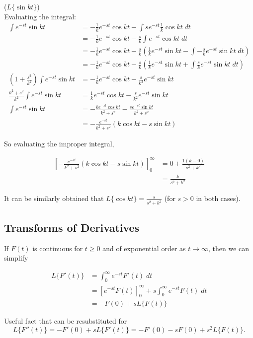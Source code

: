 \begin{definition}($L\{\sin kt\}$)\\
    Evaluating the integral:
    \begin{align*}
        \int e^{-st}\sin kt&=-\frac{1}{k}e^{-st}\cos kt-\int se^{-st}\frac{1}{k}\cos kt \;dt\\
        &=-\frac{1}{k}e^{-st}\cos kt-\frac{s}{k}\int e^{-st}\cos kt \;dt\\
        &=-\frac{1}{k}e^{-st}\cos kt-\frac{s}{k}\left( \frac{1}{k}e^{-st}\sin kt-\int -\frac{s}{k}e^{-st}\sin kt\;dt \right)\\
        &=-\frac{1}{k}e^{-st}\cos kt-\frac{s}{k}\left(\frac{1}{k}e^{-st}\sin kt + \int \frac{s}{k}e^{-st}\sin kt\;dt\right)\\
        (1+\frac{s^2}{k^2})\int e^{-st}\sin kt&=-\frac{1}{k}e^{-st}\cos kt-\frac{s}{k^2}e^{-st}\sin kt\\
        \frac{k^2+s^2}{k^2}\int e^{-st}\sin kt&=\frac{1}{k}e^{-st}\cos kt-\frac{s}{k^2}e^{-st}\sin kt\\
        \int e^{-st}\sin kt&=-\frac{ke^{-st}\cos kt}{k^2+s^2}-\frac{se^{-st}\sin kt}{k^2+s^2}\\
        &=-\frac{e^{-st}}{k^2+s^2}\left(k\cos kt-s\sin kt\right)
    \end{align*}

    So evaluating the improper integral,
    
    \begin{align*}
        \left[-\frac{e^{-st}}{k^2+s^2}\left(k\cos kt-s\sin kt\right)\right]_0^\infty&=0+\frac{1(k-0)}{s^2+k^2}\\
        &=\frac{k}{s^2+k^2}
    \end{align*}

    It can be similarly obtained that $L\{\cos kt\}=\frac{s}{s^2+k^2}$ (for $s>0$ in both cases).
\end{definition}

\subsection{Transforms of Derivatives}

If $F(t)$ is continuous for $t\geq 0$ and of exponential order as $t\to \infty$, then we can simplify

\begin{align}
    L\{F'(t)\}&=\int_0^\infty e^{-st}F'(t)\;dt\\
    &=\left[e^{-st}F(t)\right]_0^\infty+s\int_0^\infty e^{-st}F(t)\;dt\\
    &=-F(0)+sL\{F(t)\}
\end{align}

Useful fact that can be resubstituted for \[L\{F''(t)\}=-F'(0)+sL\{F'(t)\}=-F'(0)-sF(0)+s^2L\{F(t)\}.\]